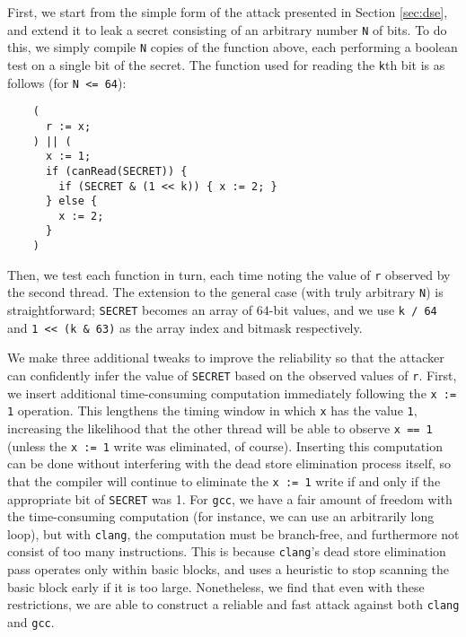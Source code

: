 
First, we start from the simple form of the attack presented in Section
\ref{sec:dse}, and extend it to leak a secret consisting of an arbitrary
number \verb|N| of bits.
To do this, we simply compile \verb|N| copies of the function above, each
performing a boolean test on a single bit of the secret.
The function used for reading the \verb|k|th bit is as follows (for
\verb|N <= 64|):
\begin{verbatim}
    (
      r := x;
    ) || (
      x := 1;
      if (canRead(SECRET)) {
        if (SECRET & (1 << k)) { x := 2; }
      } else {
        x := 2;
      }
    )
\end{verbatim}
Then, we test each function in turn, each time noting the value of \verb|r|
observed by the second thread.
The extension to the general case (with truly arbitrary \verb|N|) is
straightforward; \verb|SECRET| becomes an array of 64-bit values, and we use
\verb|k / 64| and \verb|1 << (k & 63)| as the array index and bitmask
respectively.

We make three additional tweaks to improve the reliability so that the attacker
can confidently infer the value of \verb|SECRET| based on the observed values
of \verb|r|.
First, we insert additional time-consuming computation immediately following
the \verb|x := 1| operation.
This lengthens the timing window in which \verb|x| has the value \verb|1|,
increasing the likelihood that the other thread will be able to observe
\verb|x == 1| (unless the \verb|x := 1| write was eliminated, of course).
Inserting this computation can be done without interfering with the dead store
elimination process itself, so that the compiler will continue to eliminate
the \verb|x := 1| write if and only if the appropriate bit of \verb|SECRET|
was 1.
For \verb|gcc|, we have a fair amount of freedom with the time-consuming
computation (for instance, we can use an arbitrarily long loop), but with
\verb|clang|, the computation must be branch-free, and furthermore not consist
of too many instructions.
This is because \verb|clang|'s dead store elimination pass operates only
within basic blocks, and uses a heuristic to stop scanning the basic block
early if it is too large.
Nonetheless, we find that even with these restrictions, we are able to
construct a reliable and fast attack against both \verb|clang| and \verb|gcc|.

